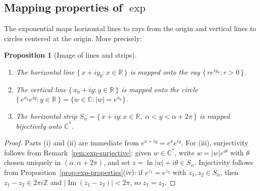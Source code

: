 \documentclass[12pt,a4paper,openany]{book}
\theoremstyle{definition}
\theoremstyle{plain}
\newtheorem{proposition}[definition]{Proposition}
\theoremstyle{remark}
\newcommand{\C}{\mathbb{C}}
\newcommand{\R}{\mathbb{R}}
\newcommand{\Z}{\mathbb{Z}}
\DeclareMathOperator{\im}{Im}
\newcommand{\abs}[1]{\left|#1\right|}
\begin{document}
\subsection{Mapping properties of $\exp$}

The exponential maps horizontal lines to rays from the origin and vertical
lines to circles centered at the origin.  More precisely:

\begin{proposition}[Image of lines and strips]\label{prop:exp-mapping}
\leavevmode
\begin{enumerate}[label=\textup{(\roman*)}]
  \item The horizontal line $\{\,x+iy_0 : x\in\R\,\}$ is mapped onto the
    ray $\{\,re^{iy_0} : r>0\,\}$.
  \item The vertical line $\{\,x_0+iy : y\in\R\,\}$ is mapped onto the
    circle $\{\,e^{x_0}e^{iy} : y\in\R\,\} = \{w\in\C : \abs{w}=e^{x_0}\}$.
  \item The horizontal strip $S_\alpha = \{\,x+iy : x\in\R,\;\alpha < y < \alpha+2\pi\,\}$
    is mapped \emph{bijectively} onto $\C^*$.
\end{enumerate}
\end{proposition}

\begin{proof}
Parts (i) and (ii) are immediate from $e^{x+iy} = e^x e^{iy}$.  For (iii),
surjectivity follows from Remark~\ref{rem:exp-surjective}: given $w\in\C^*$,
write $w = \abs{w}e^{i\theta}$ with $\theta$ chosen uniquely in
$(\alpha,\alpha+2\pi)$, and set $z = \ln\abs{w}+i\theta\in S_\alpha$.
Injectivity follows from Proposition~\ref{prop:exp-properties}(iv): if
$e^{z_1}=e^{z_2}$ with $z_1,z_2\in S_\alpha$, then $z_1-z_2\in 2\pi i\Z$
and $\abs{\im(z_1-z_2)}<2\pi$, so $z_1=z_2$.
\end{proof}
\end{document}
